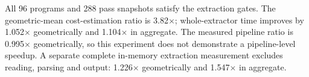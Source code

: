 All 96 programs and 288 pass snapshots satisfy the extraction gates. The geometric-mean cost-estimation ratio is 3.82$\times$; whole-extractor time improves by 1.052$\times$ geometrically and 1.104$\times$ in aggregate. The measured pipeline ratio is 0.995$\times$ geometrically, so this experiment does not demonstrate a pipeline-level speedup.
A separate complete in-memory extraction measurement excludes reading, parsing and output: 1.226$\times$ geometrically and 1.547$\times$ in aggregate.
